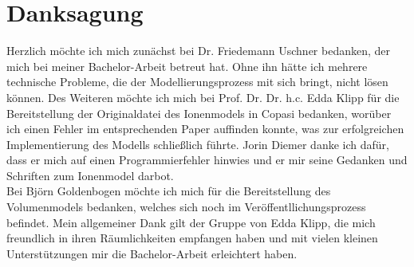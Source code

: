 \section{Danksagung}
Herzlich möchte ich mich zunächst bei Dr. Friedemann Uschner bedanken, der mich bei meiner Bachelor-Arbeit betreut hat. Ohne ihn hätte ich mehrere technische Probleme, die der Modellierungsprozess mit sich bringt, nicht lösen können. Des Weiteren möchte ich mich bei Prof. Dr. Dr. h.c. Edda Klipp für die Bereitstellung der Originaldatei des Ionenmodels in Copasi bedanken, worüber ich einen Fehler im entsprechenden Paper auffinden konnte, was zur erfolgreichen Implementierung des Modells schließlich führte. Jorin Diemer danke ich dafür, dass er mich auf einen Programmierfehler hinwies und er mir seine Gedanken und Schriften zum Ionenmodel darbot. \\
Bei Björn Goldenbogen möchte ich mich für die Bereitstellung des Volumenmodels bedanken, welches sich noch im Veröffentllichungsprozess befindet. Mein allgemeiner Dank gilt der Gruppe von Edda Klipp, die mich freundlich in ihren Räumlichkeiten empfangen haben und mit vielen kleinen Unterstützungen mir die Bachelor-Arbeit erleichtert haben.

\newpage